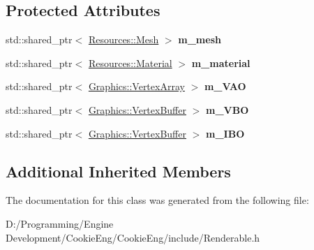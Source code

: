 \subsection*{Protected Attributes}
\begin{DoxyCompactItemize}
\item 
\mbox{\label{class_cookie_eng_1_1_components_1_1_renderable_a9da5e010c1d6c0ccb008b2af664b925a}} 
std\+::shared\+\_\+ptr$<$ \hyperlink{struct_cookie_eng_1_1_resources_1_1_mesh}{Resources\+::\+Mesh} $>$ {\bfseries m\+\_\+mesh}
\item 
\mbox{\label{class_cookie_eng_1_1_components_1_1_renderable_a69e36f6c8b8d58c978d86f2591c53ec5}} 
std\+::shared\+\_\+ptr$<$ \hyperlink{class_cookie_eng_1_1_resources_1_1_material}{Resources\+::\+Material} $>$ {\bfseries m\+\_\+material}
\item 
\mbox{\label{class_cookie_eng_1_1_components_1_1_renderable_ad9486a5a4befa25f74fe9e4d553f2ce6}} 
std\+::shared\+\_\+ptr$<$ \hyperlink{class_cookie_eng_1_1_graphics_1_1_vertex_array}{Graphics\+::\+Vertex\+Array} $>$ {\bfseries m\+\_\+\+V\+AO}
\item 
\mbox{\label{class_cookie_eng_1_1_components_1_1_renderable_a09cf84ce90d1e6474a0e89f035f74b7c}} 
std\+::shared\+\_\+ptr$<$ \hyperlink{class_cookie_eng_1_1_graphics_1_1_vertex_buffer}{Graphics\+::\+Vertex\+Buffer} $>$ {\bfseries m\+\_\+\+V\+BO}
\item 
\mbox{\label{class_cookie_eng_1_1_components_1_1_renderable_ad78ea55ae87ccf49d3643e50aed49d2c}} 
std\+::shared\+\_\+ptr$<$ \hyperlink{class_cookie_eng_1_1_graphics_1_1_vertex_buffer}{Graphics\+::\+Vertex\+Buffer} $>$ {\bfseries m\+\_\+\+I\+BO}
\end{DoxyCompactItemize}
\subsection*{Additional Inherited Members}


The documentation for this class was generated from the following file\+:\begin{DoxyCompactItemize}
\item 
D\+:/\+Programming/\+Engine Development/\+Cookie\+Eng/\+Cookie\+Eng/include/Renderable.\+h\end{DoxyCompactItemize}
